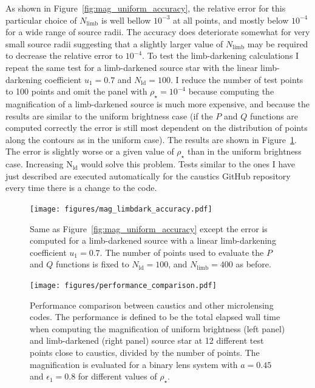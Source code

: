\documentclass[12pt,dvipsnames]{report}
\newcommand{\ssf}[1]{\textsf{#1}}
\begin{document}
As shown in Figure~\ref{fig:mag_uniform_accuracy}, the relative error for this  particular 
choice of $N_\mathrm{limb}$ is well bellow $10^{-3}$ at all points, and mostly below $10^{-4}$ 
for a wide range of source radii. The accuracy does deteriorate somewhat for very small 
source radii suggesting that a slightly larger value of $N_\mathrm{limb}$ may be required 
to decrease the relative error to $10^{-4}$.  To test the limb-darkening calculations 
I repeat the same test for a limb-darkened source star with the linear limb-darkening 
coefficient $u_1=0.7$ and $N_\mathrm{ld}=100$. I reduce the number of test points to 100 points and omit the panel
with $\rho_\star=10^{-4}$ because computing the magnification of a limb-darkened source 
is much more expensive, and because the results are similar to the uniform brightness case 
(if the $P$ and $Q$ functions are computed correctly the error is still most dependent on 
the distribution of points along the contours as in the uniform case).
The results are shown in Figure~\ref{fig:mag_limbdark_accuracy}. The error is slightly worse
or a given value of $\rho_\star$ than in the uniform brightness case. 
Increasing  $\mathrm{N}_\mathrm{ld}$ would solve this problem.
Tests similar to the ones I have just described are executed automatically for the 
\ssf{caustics} \ssf{GitHub} repository every time there is a change to the code.

\begin{figure}[t]
    \begin{centering}
        \texttt{[image: figures/mag\_limbdark\_accuracy.pdf]}
        \caption{Same as Figure~\ref{fig:mag_uniform_accuracy} except the error is computed 
        for a limb-darkened source with a linear limb-darkening coefficient $u_1=0.7$. The 
        number of points used to evaluate the $P$ and $Q$ functions is fixed to 
        $N_\mathrm{ld}=100$, and $N_\mathrm{limb}=400$ as before.}
            \label{fig:mag_limbdark_accuracy}
    \end{centering}
\end{figure}

\begin{figure}[t]
    \begin{centering}
        \texttt{[image: figures/performance\_comparison.pdf]}
        \caption{Performance comparison between \ssf{caustics} and other microlensing codes.
        The performance is defined to be the total elapsed wall time when computing the 
        magnification of uniform brightness (left panel) and limb-darkened (right panel) 
        source star at 12 different test points close to caustics, divided by the number of points.
        The magnification is evaluated for a binary lens system with $a=0.45$ and 
        $\epsilon_1=0.8$ for different values of $\rho_\star$.
        }
            \label{fig:performance_comparison}
    \end{centering}
\end{figure}
\end{document}

